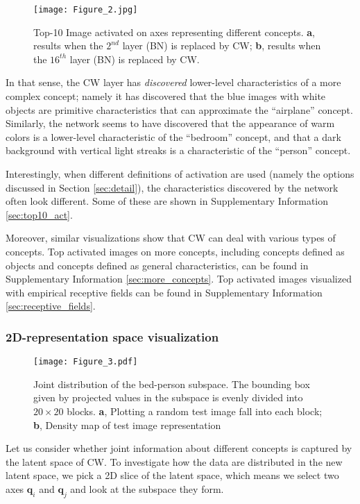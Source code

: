 \documentclass{article}
\begin{document}
\begin{figure}[htbp]
    \centering
    \texttt{[image: Figure\_2.jpg]}
    \caption{Top-10 Image activated on axes representing different concepts. \textbf{a}, results when the $2^{nd}$ layer (BN) is replaced by CW; \textbf{b}, results when the $16^{th}$ layer (BN) is replaced by CW.\label{fig:top10}}
\end{figure}

In that sense, the CW layer has \textit{discovered} lower-level characteristics of a more complex concept; namely it has discovered that the blue images with white objects are primitive characteristics that can approximate the ``airplane'' concept. Similarly, the network seems to have discovered that the appearance of warm colors is a lower-level characteristic of the ``bedroom'' concept, and that a dark background with vertical light streaks is a characteristic of the ``person'' concept. 

Interestingly, when different definitions of activation are used (namely the options discussed in Section \ref{sec:detail}), the characteristics discovered by the network often look different. Some of these are shown in Supplementary Information \ref{sec:top10_act}. 

Moreover, similar visualizations show that CW can deal with various types of concepts. Top activated images on more concepts, including concepts defined as objects and concepts defined as general characteristics, can be found in Supplementary Information \ref{sec:more_concepts}. Top activated images visualized with empirical receptive fields can be found in Supplementary Information \ref{sec:receptive_fields}.

\subsubsection{2D-representation space visualization} \label{sec:2drep}

\begin{figure*}[t]
\centering
\texttt{[image: Figure\_3.pdf]}
\caption{Joint distribution of the bed-person subspace. The bounding box given by projected values in the subspace is evenly divided into $20\times20$ blocks. \textbf{a}, Plotting a random test image fall into each block; \textbf{b}, Density map of test image representation\label{fig:2drep}}
\end{figure*}


Let us consider whether joint information about different concepts is captured by the latent space of CW. To investigate how the data are distributed in the new latent space, we pick a 2D slice of the latent space, which means we select two axes $\mathbf{q}_i$ and $\mathbf{q}_j$ and look at the subspace they form.
\end{document}
